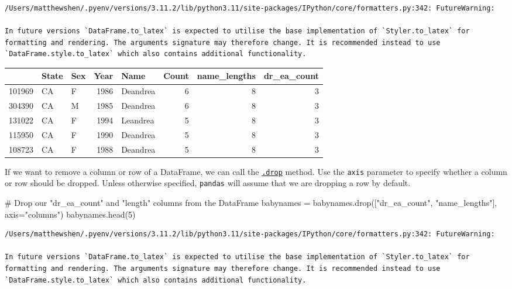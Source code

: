 \documentclass[
  letterpaper,
  DIV=11,
  numbers=noendperiod]{scrreprt}
\newenvironment{Shaded}{\begin{snugshade}}{\end{snugshade}}
\newcommand{\CommentTok}[1]{\textcolor[rgb]{0.37,0.37,0.37}{#1}}
\newcommand{\DecValTok}[1]{\textcolor[rgb]{0.68,0.00,0.00}{#1}}
\newcommand{\NormalTok}[1]{\textcolor[rgb]{0.00,0.23,0.31}{#1}}
\newcommand{\OperatorTok}[1]{\textcolor[rgb]{0.37,0.37,0.37}{#1}}
\newcommand{\StringTok}[1]{\textcolor[rgb]{0.13,0.47,0.30}{#1}}
\begin{document}
\begin{verbatim}
/Users/matthewshen/.pyenv/versions/3.11.2/lib/python3.11/site-packages/IPython/core/formatters.py:342: FutureWarning:

In future versions `DataFrame.to_latex` is expected to utilise the base implementation of `Styler.to_latex` for formatting and rendering. The arguments signature may therefore change. It is recommended instead to use `DataFrame.style.to_latex` which also contains additional functionality.
\end{verbatim}

\begin{tabular}{lllrlrrr}
\toprule
{} & State & Sex &  Year &      Name &  Count &  name\_lengths &  dr\_ea\_count \\
\midrule
101969 &    CA &   F &  1986 &  Deandrea &      6 &             8 &            3 \\
304390 &    CA &   M &  1985 &  Deandrea &      6 &             8 &            3 \\
131022 &    CA &   F &  1994 &  Leandrea &      5 &             8 &            3 \\
115950 &    CA &   F &  1990 &  Deandrea &      5 &             8 &            3 \\
108723 &    CA &   F &  1988 &  Deandrea &      5 &             8 &            3 \\
\bottomrule
\end{tabular}

If we want to remove a column or row of a DataFrame, we can call the
\href{https://pandas.pydata.org/pandas-docs/stable/reference/api/pandas.DataFrame.drop.html}{\texttt{.drop}}
method. Use the \texttt{axis} parameter to specify whether a column or
row should be dropped. Unless otherwise specified, \texttt{pandas} will
assume that we are dropping a row by default.

\begin{Shaded}
\begin{Highlighting}[]
\CommentTok{\# Drop our "dr\_ea\_count" and "length" columns from the DataFrame}
\NormalTok{babynames }\OperatorTok{=}\NormalTok{ babynames.drop([}\StringTok{"dr\_ea\_count"}\NormalTok{, }\StringTok{"name\_lengths"}\NormalTok{], axis}\OperatorTok{=}\StringTok{"columns"}\NormalTok{)}
\NormalTok{babynames.head(}\DecValTok{5}\NormalTok{)}
\end{Highlighting}
\end{Shaded}

\begin{verbatim}
/Users/matthewshen/.pyenv/versions/3.11.2/lib/python3.11/site-packages/IPython/core/formatters.py:342: FutureWarning:

In future versions `DataFrame.to_latex` is expected to utilise the base implementation of `Styler.to_latex` for formatting and rendering. The arguments signature may therefore change. It is recommended instead to use `DataFrame.style.to_latex` which also contains additional functionality.
\end{verbatim}
\end{document}
